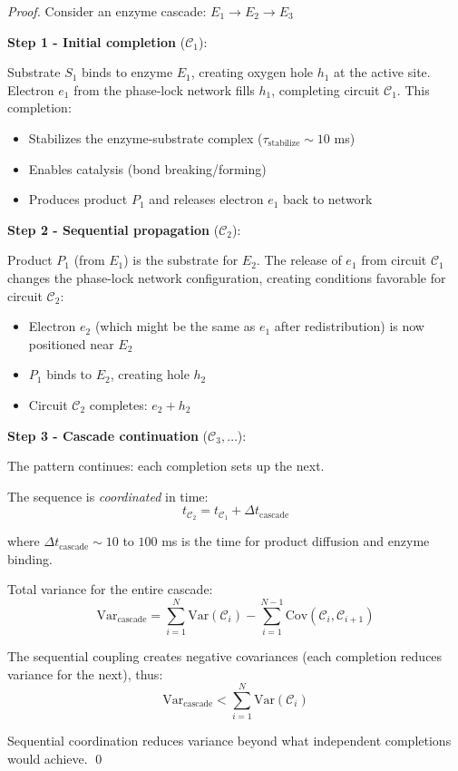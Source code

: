 \documentclass[12pt,a4paper]{article}
\begin{document}
\begin{proof}
Consider an enzyme cascade: $E_1 \to E_2 \to E_3$

\textbf{Step 1 - Initial completion} ($\mathcal{C}_1$):

Substrate $S_1$ binds to enzyme $E_1$, creating oxygen hole $h_1$ at the active site. Electron $e_1$ from the phase-lock network fills $h_1$, completing circuit $\mathcal{C}_1$. This completion:
\begin{itemize}
\item Stabilizes the enzyme-substrate complex ($\tau_{\text{stabilize}} \sim 10$ ms)
\item Enables catalysis (bond breaking/forming)
\item Produces product $P_1$ and releases electron $e_1$ back to network
\end{itemize}

\textbf{Step 2 - Sequential propagation} ($\mathcal{C}_2$):

Product $P_1$ (from $E_1$) is the substrate for $E_2$. The release of $e_1$ from circuit $\mathcal{C}_1$ changes the phase-lock network configuration, creating conditions favorable for circuit $\mathcal{C}_2$:
\begin{itemize}
\item Electron $e_2$ (which might be the same as $e_1$ after redistribution) is now positioned near $E_2$
\item $P_1$ binds to $E_2$, creating hole $h_2$
\item Circuit $\mathcal{C}_2$ completes: $e_2 + h_2$
\end{itemize}

\textbf{Step 3 - Cascade continuation} ($\mathcal{C}_3, \ldots$):

The pattern continues: each completion sets up the next.

The sequence is \textit{coordinated} in time:
\begin{equation}
t_{\mathcal{C}_2} = t_{\mathcal{C}_1} + \Delta t_{\text{cascade}}
\end{equation}

where $\Delta t_{\text{cascade}} \sim 10$ to $100$ ms is the time for product diffusion and enzyme binding.

Total variance for the entire cascade:
\begin{equation}
\text{Var}_{\text{cascade}} = \sum_{i=1}^{N} \text{Var}(\mathcal{C}_i) - \sum_{i=1}^{N-1} \text{Cov}(\mathcal{C}_i, \mathcal{C}_{i+1})
\end{equation}

The sequential coupling creates negative covariances (each completion reduces variance for the next), thus:
\begin{equation}
\text{Var}_{\text{cascade}} < \sum_{i=1}^{N} \text{Var}(\mathcal{C}_i)
\end{equation}

Sequential coordination reduces variance beyond what independent completions would achieve. \qed
\end{proof}
\end{document}
